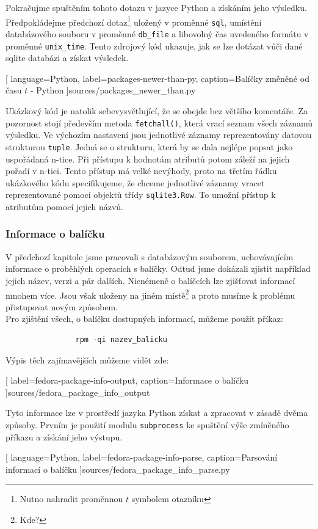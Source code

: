 \documentclass[10pt,a4paper]{article}
\begin{document}
			Pokračujme spuštěním tohoto dotazu v jazyce Python a získáním jeho výsledku. Předpokládejme předchozí dotaz\footnote{Nutno nahradit proměnnou $t$ symbolem otazníku} uložený v proměnné \texttt{sql}, umístění databázového souboru v proměnné \texttt{db\_file} a libovolný čas uvedeného formátu v proměnné \texttt{unix\_time}. Tento zdrojový kód ukazuje, jak se lze dotázat vůči dané sqlite databázi a získat výsledek.

			
			[
				language=Python,
				label=packages-newer-than-py,
				caption={Balíčky změněné od času $t$ - Python}
			]{sources/packages_newer_than.py}

			Ukázkový kód je natolik sebevysvětlující, že se obejde bez většího komentáře. Za pozornost stojí především metoda \texttt{fetchall()}, která vrací seznam všech záznamů výsledku. Ve výchozím nastavení jsou jednotlivé záznamy reprezentovány datovou strukturou \texttt{tuple}. Jedná se o strukturu, která by se dala nejlépe popsat jako uspořádaná n-tice. Při přístupu k hodnotám atributů potom záleží na jejich pořadí v n-tici. Tento přístup má velké nevýhody, proto na třetím řádku ukázkového kódu specifikujeme, že chceme jednotlivé záznamy vracet reprezentované pomocí objektů třídy \texttt{sqlite3.Row}. To umožní přístup k atributům pomocí jejich názvů.

			\pagebreak
			\subsubsection{Informace o balíčku}
			V předchozí kapitole jsme pracovali s databázovým souborem, uchovávajícím informace o proběhlých operacích s balíčky. Odtud jsme dokázali zjistit například jejich název, verzi a pár dalších. Nicnémeně o balíčcích lze zjišťovat informací mnohem více. Jsou však uloženy na jiném místě\footnote{Kde?} a proto musíme k problému přistupovat novým způsobem.
			\\
			Pro zjištění všech, o balíčku dostupných informací, můžeme použít příkaz:

			\begin{lstlisting}
				rpm -qi nazev_balicku
			\end{lstlisting}

			Výpis těch zajímavějších můžeme vidět zde:
			
			[
				label=fedora-package-info-output,
				caption={Informace o balíčku}
			]{sources/fedora_package_info_output}

			Tyto informace lze v prostředí jazyka Python získat a zpracovat v zásadě dvěma způsoby. Prvním je použití modulu \texttt{subprocess} ke spuštění výše zmíněného příkazu a získání jeho výstupu.
			
			[
				language=Python,
				label=fedora-package-info-parse,
				caption={Parsování informací o balíčku}
			]{sources/fedora_package_info_parse.py}
\end{document}
